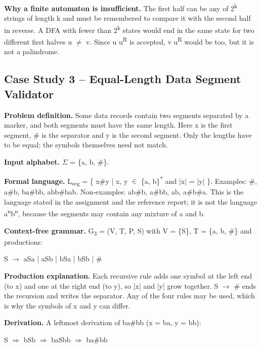 \documentclass[12pt,a4paper]{article}
\begin{document}
\textbf{Why a finite automaton is insufficient.} The first half can be any of 2\textsuperscript{k} strings of length k and must be remembered to compare it with the second half in reverse. A DFA with fewer than 2\textsuperscript{k} states would end in the same state for two different first halves u \ensuremath{\neq} v. Since u u\textsuperscript{R} is accepted, v u\textsuperscript{R} would be too, but it is not a palindrome.

\subsection{Case Study 3 -- Equal-Length Data Segment Validator}

\textbf{Problem definition.} Some data records contain two segments separated by a marker, and both segments must have the same length. Here x is the first segment, \# is the separator and y is the second segment. Only the lengths have to be equal; the symbols themselves need not match.

\textbf{Input alphabet.} \ensuremath{\Sigma} = \{a, b, \#\}.

\textbf{Formal language.} L\textsubscript{seg} = \{ x\#y | x, y \ensuremath{\in} \{a, b\}\textsuperscript{*} and |x| = |y| \}. Examples: \#, a\#b, ba\#bb, abb\#bab. Non-examples: ab\#b, a\#bb, ab, a\#b\#a. This is the language stated in the assignment and the reference report; it is not the language a\textsuperscript{n}b\textsuperscript{n}, because the segments may contain any mixture of a and b.

\textbf{Context-free grammar.} G\textsubscript{3} = (V, T, P, S) with V = \{S\}, T = \{a, b, \#\} and productions:

\begin{center}S \ensuremath{\rightarrow} aSa  |  aSb  |  bSa  |  bSb  |  \#\end{center}

\textbf{Production explanation.} Each recursive rule adds one symbol at the left end (to x) and one at the right end (to y), so |x| and |y| grow together. S \ensuremath{\rightarrow} \# ends the recursion and writes the separator. Any of the four rules may be used, which is why the symbols of x and y can differ.

\textbf{Derivation.} A leftmost derivation of ba\#bb (x = ba, y = bb):

\begin{center}S \ensuremath{\Rightarrow} bSb \ensuremath{\Rightarrow} baSbb \ensuremath{\Rightarrow} ba\#bb\end{center}
\end{document}
